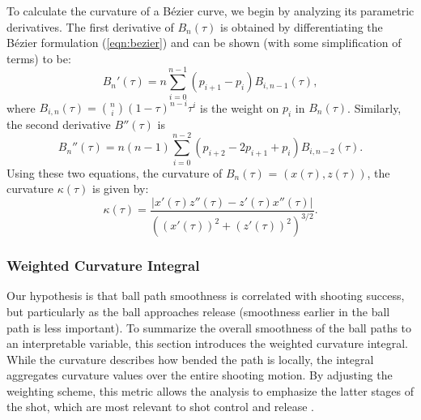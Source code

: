 \documentclass{article}
\begin{document}
          To calculate the curvature of a Bézier curve, we begin by analyzing its parametric derivatives. The first derivative of \(B_n(\tau)\) is obtained by differentiating the Bézier formulation (\ref{eqn:bezier}) and can be shown (with some simplification of terms) to be:
          \[ 
            B_n'(\tau) = n \sum_{i=0}^{n-1} (p_{i+1} - p_i) B_{i,n-1}(\tau),
          \]
          where \(B_{i, n}(\tau) = \binom{n}{i}(1 - \tau)^{n-i}\tau^i\) is the weight on $p_i$ in $B_n(\tau)$. Similarly, the second derivative \( B''(\tau) \) is
          \[
            B_n''(\tau) = n(n-1) \sum_{i=0}^{n-2} (p_{i+2} - 2p_{i+1} + p_i) B_{i,n-2}(\tau).
          \]
          Using these two equations, the curvature of \(B_n(\tau)\) = \((x(\tau), z(\tau))\), the curvature \( \kappa(\tau) \) is given by:
          \[
            \kappa(\tau) = \frac{\left| x'(\tau) z''(\tau) - z'(\tau) x''(\tau) \right|}{\left( (x'(\tau))^2 + (z'(\tau))^2 \right)^{3/2}}.
          \]
    
        \subsubsection{Weighted Curvature Integral}
        \label{sec:weighted-curvature-integral}
    
        
          Our hypothesis is that ball path smoothness is correlated with shooting success, but particularly as the ball approaches release (smoothness earlier in the ball path is less important). To summarize the overall smoothness of the ball paths to an interpretable variable, this section introduces the weighted curvature integral. While the curvature describes how bended the path is locally, the integral aggregates curvature values over the entire shooting motion. By adjusting the weighting scheme, this metric allows the analysis to emphasize the latter stages of the shot, which are most relevant to shot control and release \citep{button_examining_2003}.
    
\end{document}
